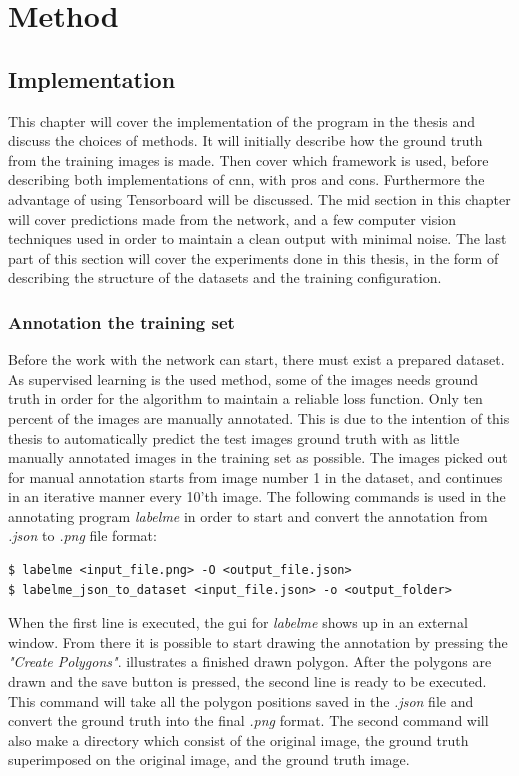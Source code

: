 \documentclass[USenglish]{ifimaster}  %
\begin{document}
\chapter{Method}\label{method}
\section{Implementation}
This chapter will cover the implementation of the program in the thesis and discuss the choices of methods. It will initially describe how the ground truth from the training images is made. Then cover which framework is used, before describing both implementations of \ac{cnn}, with pros and cons. Furthermore the advantage of using Tensorboard will be discussed. The mid section in this chapter will cover predictions made from the network, and a few computer vision techniques used in order to maintain a clean output with minimal noise. The last part of this section will cover the experiments done in this thesis, in the form of describing the structure of the datasets and the training configuration.
\subsection{Annotation the training set}
Before the work with the network can start, there must exist a prepared dataset. As supervised learning is the used method, some of the images needs ground truth in order for the algorithm to maintain a reliable loss function. Only ten percent of the images are manually annotated. This is due to the intention of this thesis to automatically predict the test images ground truth with as little manually annotated images in the training set as possible. The images picked out for manual annotation starts from image number 1 in the dataset, and continues in an iterative manner every 10'th image. The following commands is used in the annotating program \textit{labelme} in order to start and convert the annotation from \textit{.json} to \textit{.png} file format:   

\begin{verbatim}
$ labelme <input_file.png> -O <output_file.json>
$ labelme_json_to_dataset <input_file.json> -o <output_folder>
\end{verbatim}

When the first line is executed, the \ac{gui} for \textit{labelme} shows up in an external window. From there it is possible to start drawing the annotation by pressing the \textit{"Create Polygons"}.  illustrates a finished drawn polygon. After the polygons are drawn and the save button is pressed, the second line is ready to be executed. This command will take all the polygon positions saved in the \textit{.json} file and convert the ground truth into the final \textit{.png} format. The second command will also make a directory which consist of the original image, the ground truth superimposed on the original image, and the ground truth image. 
\end{document}
